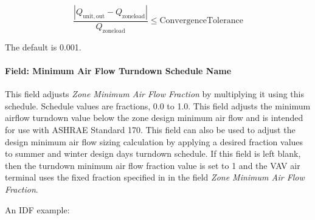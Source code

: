 \begin{equation}
  \frac{\left| Q_{\mathrm{unit, out}} - Q_{\mathrm{zone load}} \right|}{Q_{\mathrm{zone load}}} \le \mathrm{ConvergenceTolerance}
\end{equation}


The default is 0.001.

\paragraph{Field: Minimum Air Flow Turndown Schedule Name}

This field adjusts \textit{Zone Minimum Air Flow Fraction} by multiplying it using this schedule. Schedule values are fractions, 0.0 to 1.0. This field adjusts the minimum airflow turndown value below the zone design minimum air flow and is intended for use with ASHRAE Standard 170. This field can also be used to adjust the design minimum air flow sizing calculation by applying a desired fraction values to summer and winter design days turndown schedule. If this field is left blank, then the turndown minimum air flow fraction value is set to 1 and the VAV air terminal uses the fixed fraction specified in in the field \textit{Zone Minimum Air Flow Fraction}.

An IDF example:

